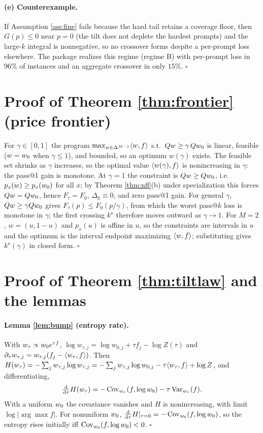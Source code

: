 \paragraph{(e) Counterexample.}
If Assumption \ref{ass:fine} fails because the hard tail retains a coverage
floor, then $G(p)\le0$ near $p=0$ (the tilt does not deplete the hardest prompts)
and the large-$k$ integral is nonnegative, so no crossover forms despite a
per-prompt loss elsewhere. The package realizes this regime (regime B) with
per-prompt loss in $96\%$ of instances and an aggregate crossover in only
$15\%$. $\square$

\section{Proof of Theorem \ref{thm:frontier} (price frontier)}

For $\gamma\in[0,1]$ the program $\max_{w\in\Delta^{M-1}}\langle w, f\rangle$ s.t.\
$Qw\ge\gamma\,Qw_0$ is linear, feasible ($w=w_0$ when $\gamma\le1$), and bounded,
so an optimum $w(\gamma)$ exists. The feasible set shrinks as $\gamma$ increases,
so the optimal value $\langle w(\gamma), f\rangle$ is nonincreasing in $\gamma$: the
pass@1 gain is monotone. At $\gamma=1$ the constraint is $Qw\ge Qw_0$, i.e.\
$p_x(w)\ge p_x(w_0)$ for all $x$; by Theorem \ref{thm:nfl}(b) under specialization
this forces $Qw=Qw_0$, hence $F_\tau=F_0$, $\Delta_k\equiv0$, and zero pass@1
gain. For general $\gamma$, $Qw\ge\gamma Qw_0$ gives
$F_\tau(p)\le F_0(p/\gamma)$, from which the worst pass@$k$ loss is monotone in
$\gamma$; the first crossing $k^\star$ therefore moves outward as $\gamma\to1$.
For $M=2$, $w=(u,1-u)$ and $p_x(u)$ is affine in $u$, so the constraints are
intervals in $u$ and the optimum is the interval endpoint maximizing
$\langle w, f\rangle$; substituting gives $k^\star(\gamma)$ in closed form. $\square$

\section{Proof of Theorem \ref{thm:tiltlaw} and the lemmas}

\paragraph{Lemma \ref{lem:bump} (entropy rate).}
With $w_\tau\propto w_0 e^{\tau f}$, $\log w_{\tau,j}=\log w_{0,j}+\tau f_j-\log
Z(\tau)$ and $\partial_\tau w_{\tau,j}=w_{\tau,j}(f_j-\langle w_\tau, f\rangle)$. Then
$H(w_\tau)=-\sum_j w_{\tau,j}\log w_{\tau,j}=-\sum_j w_{\tau,j}\log w_{0,j}
-\tau\langle w_\tau, f\rangle+\log Z$, and differentiating,
\[
\tfrac{\mathrm d}{\mathrm d\tau}H(w_\tau)
=-\operatorname{Cov}_{w_\tau}(f,\log w_0)-\tau\operatorname{Var}_{w_\tau}(f).
\]
With a uniform $w_0$ the covariance vanishes and $H$ is nonincreasing, with limit
$\log|\arg\max f|$. For nonuniform $w_0$, $\tfrac{\mathrm d}{\mathrm
d\tau}H|_{\tau=0}=-\operatorname{Cov}_{w_0}(f,\log w_0)$, so the entropy rises initially iff
$\operatorname{Cov}_{w_0}(f,\log w_0)<0$. $\square$

